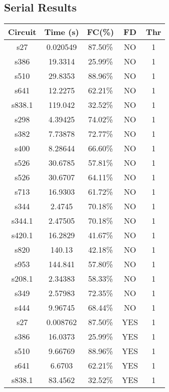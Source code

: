\documentclass[a4paper,11pt]{article}
\begin{document}
\clearpage

\subsection*{Serial Results}

\begin{center}
\begin{tabular}{||c c c c c||}
\hline
Circuit & Time (s) & FC(\%) & FD & Thr \\ [0.5ex] 
\hline\hline
 s27 & 0.020549 & 87.50\% & NO  & 1 \\ 
\hline
 s386 & 19.3314 & 25.99\% & NO  & 1 \\ 
\hline
 s510 & 29.8353 & 88.96\% & NO  & 1 \\ 
\hline
 s641 & 12.2275 & 62.21\% & NO  & 1 \\ 
\hline
 s838.1 & 119.042 & 32.52\% & NO  & 1 \\ 
\hline
 s298 & 4.39425 & 74.02\% & NO  & 1 \\ 
\hline
 s382 & 7.73878 & 72.77\% & NO  & 1 \\ 
\hline
 s400 & 8.28644 & 66.60\% & NO  & 1 \\ 
\hline
 s526 & 30.6785 & 57.81\% & NO  & 1 \\ 
\hline
 s526 & 30.6707 & 64.11\% & NO  & 1 \\ 
\hline
 s713 & 16.9303 & 61.72\% & NO  & 1 \\ 
\hline
 s344 & 2.4745 & 70.18\% & NO  & 1 \\ 
\hline
 s344.1 & 2.47505 & 70.18\% & NO  & 1 \\ 
\hline
 s420.1 & 16.2829 & 41.67\% & NO  & 1 \\ 
\hline
 s820 & 140.13 & 42.18\% & NO  & 1 \\ 
\hline
 s953 & 144.841 & 57.80\% & NO  & 1 \\ 
\hline
 s208.1 & 2.34383 & 58.33\% & NO  & 1 \\ 
\hline
 s349 & 2.57983 & 72.35\% & NO  & 1 \\ 
\hline
 s444 & 9.96745 & 68.44\% & NO  & 1 \\ 
\hline
 s27 & 0.008762 & 87.50\% & YES  & 1 \\ 
\hline
 s386 & 16.0373 & 25.99\% & YES  & 1 \\ 
\hline
 s510 & 9.66769 & 88.96\% & YES  & 1 \\ 
\hline
 s641 & 6.6703 & 62.21\% & YES  & 1 \\ 
\hline
 s838.1 & 83.4562 & 32.52\% & YES  & 1 \\ 

\end{tabular}
\end{center}
\end{document}
